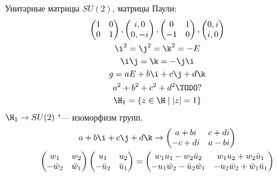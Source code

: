 Унитарные матрицы $SU(2)$, матрицы Паули:
\begin{gather*}
    \begin{pmatrix}
        1 & 0 \\
        0 & 1
    \end{pmatrix},\begin{pmatrix}
        i,  0 \\
        0, -i
    \end{pmatrix},\begin{pmatrix}
         0 & 1 \\
        -1 & 0
    \end{pmatrix},\begin{pmatrix}
        0, i \\
        i, 0
    \end{pmatrix} \\
    \i^2 = \j^2 = \k^2 = -E \\
    \i\j = \k = -\j\i \\
    g = aE + b\i + c\j + d\k \\
    a^2 + b^2 + c^2 + d^2 \TODO? \\
    \H_1 = \{z \in \H \mid |z| = 1\}
\end{gather*}
$\H_1 \to SU(2)$ "--- изоморфизм групп.
\begin{gather*}
    a + b\i + c\j + d\k \to \begin{pmatrix}
         a + bi & c + di \\
        -c + di & a - bi
    \end{pmatrix} \\
    \begin{pmatrix}
        w_1 & w_2 \\
        -\bar w_2& \bar w_1
    \end{pmatrix}\begin{pmatrix}
        u_1 & u_2 \\
        -\bar u_2 & \bar u_1
    \end{pmatrix} = \begin{pmatrix}
        w_1u_1 - w_2\bar u_2 & w_1u_2 + w_2 \bar u_1 \\
        -u_1\bar w_2 - \bar u_2 \bar w_1 & -u_2\bar w_2 + \bar w_1 \bar u_1
    \end{pmatrix}
\end{gather*}

